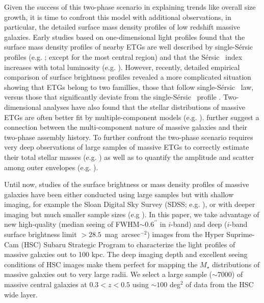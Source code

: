 \documentclass[a4paper,fleqn,usenatbib]{mnras}
\def\arcsec{{\prime\prime}}
\def\sb{mag~arcsec$^{-2}$}
\def\ser{{S\'{e}rsic\ }}
\def\mstar{{$M_{\star}$}}
\begin{document}
    Given the success of this two-phase scenario in explaining trends like overall size 
    growth, it is time to confront this model with additional observations, 
    in particular, the detailed surface mass density profiles of low redshift massive 
    galaxies. 
    Early studies based on one-dimensional light profiles found that the surface 
    mass density profiles of nearby ETGs are well described by single-\ser{} profiles 
    (e.g. \citealt{Kormendy2009}; except for the most central region) and that the 
    \ser{} index increases with total luminosity 
    (e.g. \citealt{Graham2013}). 
    However, recently, detailed empirical comparison of surface brightness profiles 
    revealed a more complicated situation showing that ETGs belong to two famillies, 
    those that follow single-\ser{} law, versus those that significantly deviate from 
    the single-\ser{} profile \citep{Schombert2015}.  
    Two-dimensional analyses have also found that the stellar distributions of massive 
    ETGs are often better fit by multiple-component models 
    (e.g. \citealt{Huang2013a, Oh2017}).  
    \citet{Huang2013b} further suggest a connection between the multi-component 
    nature of massive galaxies and their two-phase assembly history. 
    To further confront the two-phase scenario requires very deep observations of 
    large samples of massive ETGs to correctly estimate their total stellar masses
    (e.g. \citealt{Bernardi2013, DSouza2014}) as well as to quantify the amplitude and 
    scatter among outer envelopes (e.g. \citealt{Capaccioli2015, Iodice2016, 
    Iodice2017}).
    
    Until now, studies of the surface brightness or mass density profiles of massive 
    galaxies have been either conducted using large samples but with shallow imaging, 
    for example the Sloan Digital Sky Survey (SDSS; e.g. \citealt{SDSSDR7, SDSSDR12}), 
    or with deeper imaging but much smaller sample sizes (e.g \citealt{Gonzalez2005, 
    Capaccioli2015}). 
    In this paper, we take advantage of new high-quality (median seeing of
    FWHM${\sim} 0.6^{\arcsec}$ in $i$-band) and deep ($i$-band surface brightness 
    limit $> 28.5$~\sb) images from the Hyper Suprime-Cam (HSC) Subaru Strategic 
    Program \citep[SSP,][]{HSCDR1} to characterize the light profiles of massive 
    galaxies out to 100 kpc. 
    The deep imaging depth and excellent seeing conditions of HSC images make them 
    perfect for mapping the \mstar{} distributions of massive galaxies out to very 
    large radii. 
    We select a large sample (${\sim} 7000$) of massive central galaxies 
    at $0.3 < z < 0.5$ using ${\sim} 100$ deg$^2$ of data from the HSC wide layer. 
    
\end{document}
